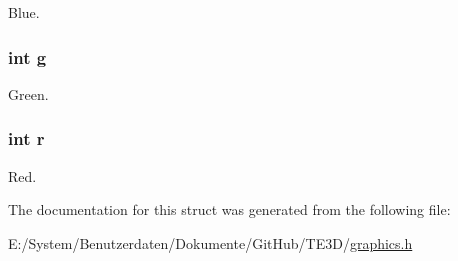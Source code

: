 Blue. 

\hypertarget{struct_t_e3_d___pixel_a71867e609034d4dbd6d0ad8d84540e59}{
\subsubsection[{g}]{\setlength{\rightskip}{0pt plus 5cm}int g}}\label{struct_t_e3_d___pixel_a71867e609034d4dbd6d0ad8d84540e59}


Green. 

\hypertarget{struct_t_e3_d___pixel_acab531abaa74a7e664e3986f2522b33a}{
\subsubsection[{r}]{\setlength{\rightskip}{0pt plus 5cm}int r}}\label{struct_t_e3_d___pixel_acab531abaa74a7e664e3986f2522b33a}


Red. 



The documentation for this struct was generated from the following file\-:\begin{DoxyCompactItemize}
\item 
E\-:/\-System/\-Benutzerdaten/\-Dokumente/\-Git\-Hub/\-T\-E3\-D/\hyperlink{graphics_8h}{graphics.\-h}\end{DoxyCompactItemize}
